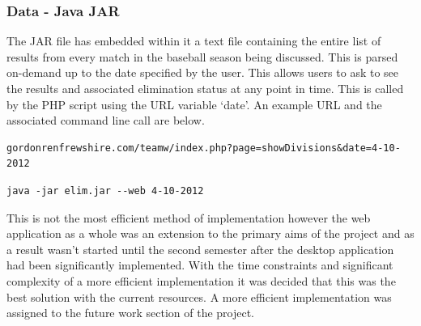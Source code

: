 \subsubsection{Data - Java JAR}

The JAR file has embedded within it a text file containing the entire list of
results from every match in the baseball season being discussed. This is parsed
on-demand up to the date specified by the user. This allows users to ask to see 
the results and associated elimination status at any point in time. This is
called by the PHP script using the URL variable `date'. An example URL and
the associated command line call are below.

\begin{verbatim}
gordonrenfrewshire.com/teamw/index.php?page=showDivisions&date=4-10-2012
\end{verbatim}

\begin{verbatim}
java -jar elim.jar --web 4-10-2012
\end{verbatim}

This is not 
the most efficient method of implementation however the web application as a 
whole was an extension to the primary aims of the project and as a result wasn't 
started until the second semester after the desktop application had been 
significantly implemented. With the time constraints and significant complexity 
of a more efficient implementation it was decided that this was the best 
solution with the current resources. A more efficient implementation was 
assigned to the future work section of the project.


